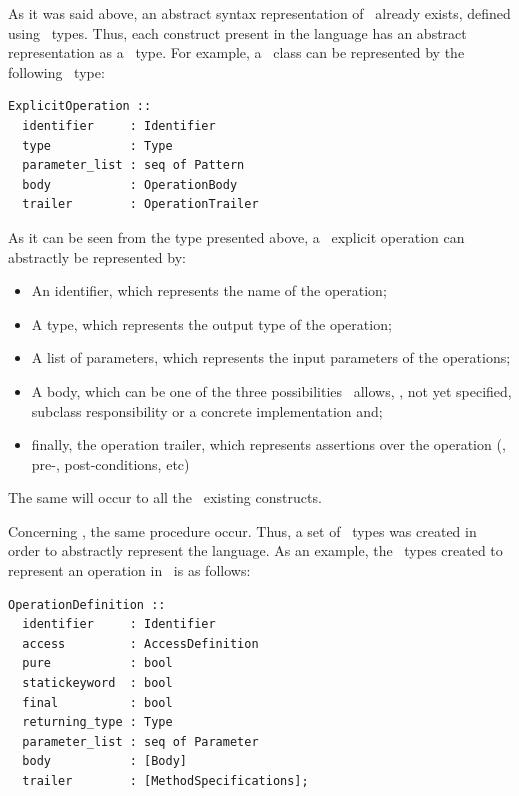 As it was said above, an abstract syntax representation of \vpp\ already exists, defined using \vdm\ types. Thus, each construct present in the language has an abstract representation as a \vdm\ type. For example, a \vpp\ class can be represented by the following \vdm\ type:

\bigskip

\lstset{style=AST}
\begin{lstlisting}
ExplicitOperation ::
  identifier     : Identifier
  type           : Type
  parameter_list : seq of Pattern
  body           : OperationBody
  trailer        : OperationTrailer
\end{lstlisting}

\bigskip

As it can be seen from the type presented above, a \vpp\ explicit operation can abstractly be represented by:
\begin{itemize} 
\item An identifier, which represents the name of the operation; 
\item A type, which represents the output type of the operation;
\item A list of parameters, which represents the input parameters of the operations;
\item A body, which can be one of the three possibilities \vpp\ allows, \ie, not yet specified, subclass responsibility or a concrete implementation and;
\item finally, the operation trailer, which represents assertions over the operation (\ie, pre-, post-conditions, etc)
\end{itemize}

The same will occur to all the \vpp\ existing constructs. 

Concerning \jml, the same procedure occur. Thus, a set of \vdm\ types was created in order to  abstractly represent the language. As an example, the \vdm\ types created to represent an operation in \jml\ is as follows:

\bigskip

\lstset{style=AST}
\begin{lstlisting}
OperationDefinition ::
  identifier     : Identifier
  access         : AccessDefinition
  pure           : bool
  statickeyword  : bool
  final          : bool
  returning_type : Type
  parameter_list : seq of Parameter
  body           : [Body]
  trailer        : [MethodSpecifications];
\end{lstlisting}

\bigskip

